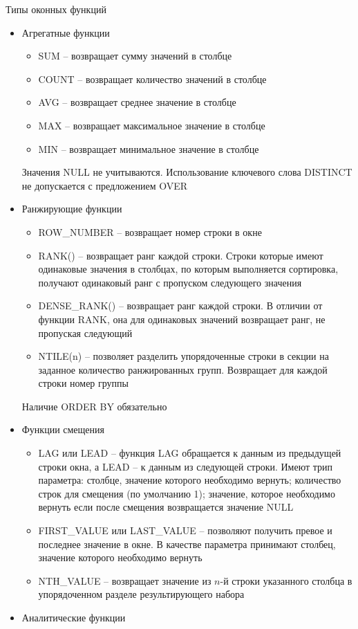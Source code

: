 \documentclass[12pt]{article}
\begin{document}
\begin{nota}{Типы оконных функций}
    \begin{itemize}
        \item Агрегатные функции
        
        \begin{itemize}
            \item SUM -- возвращает сумму значений в столбце 
            \item COUNT -- возвращает количество значений в столбце
            \item AVG -- возвращает среднее значение в столбце
            \item MAX -- возвращает максимальное значение в столбце
            \item MIN -- возвращает минимальное значение в столбце
        \end{itemize}

        Значения NULL не учитываются. Использование ключевого слова DISTINCT не допускается с предложением OVER 
        \item Ранжирующие функции 
        
        \begin{itemize}
            \item ROW\_NUMBER -- возвращает номер строки в окне 
            \item RANK() -- возвращает ранг каждой строки. Строки которые имеют одинаковые значения в столбцах, по которым выполняется сортировка, получают одинаковый ранг с пропуском следующего значения 
            \item DENSE\_RANK() -- возвращает ранг каждой строки. В отличии от функции RANK, она для одинаковых значений возвращает ранг, не пропуская следующий 
            \item NTILE(n) -- позволяет разделить упорядоченные строки в секции на заданное количество ранжированных групп. Возвращает для каждой строки номер группы 
        \end{itemize}

        Наличие ORDER BY обязательно
        \item Функции смещения
        
        \begin{itemize}
            \item LAG или LEAD -- функция LAG обращается к данным из предыдущей строки окна, а LEAD -- к данным из следующей строки. Имеют трип параметра: столбце, значение которого необходимо вернуть; количество строк для смещения (по умолчанию 1); значение, которое необходимо вернуть если после смещения возвращается значение NULL
            \item FIRST\_VALUE или LAST\_VALUE -- позволяют получить превое и последнее значение в окне. В качестве параметра принимают столбец, значение которого необходимо вернуть 
            \item NTH\_VALUE -- возвращает значение из $n$-й строки указанного столбца в упорядоченном разделе результирующего набора 
        \end{itemize}
        \item Аналитические функции 
        

\end{itemize}
\end{nota}
\end{document}
